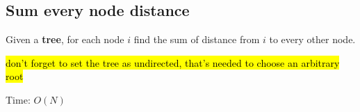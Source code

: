 \subsection{Sum every node distance}

Given a \textbf{tree}, for each node $i$ find the sum of distance from $i$ to every other node.

\hl{don't forget to set the tree as undirected, that's needed to choose an arbitrary root}

Time: $O(N)$
